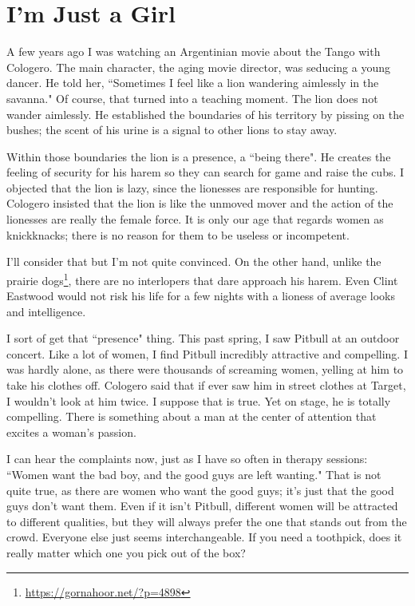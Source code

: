 \section{I'm Just a Girl}

A few years ago I was watching an Argentinian movie about the Tango with Cologero. The main character, the aging movie director, was seducing a young dancer. He told her, ``Sometimes I feel like a lion wandering aimlessly in the savanna." Of course, that turned into a teaching moment. The lion does not wander aimlessly. He established the boundaries of his territory by pissing on the bushes; the scent of his urine is a signal to other lions to stay away.

Within those boundaries the lion is a presence, a ``being there". He creates the feeling of security for his harem so they can search for game and raise the cubs. I objected that the lion is lazy, since the lionesses are responsible for hunting. Cologero insisted that the lion is like the unmoved mover and the action of the lionesses are really the female force. It is only our age that regards women as knickknacks; there is no reason for them to be useless or incompetent.

I'll consider that but I'm not quite convinced. On the other hand, unlike the prairie dogs\footnote{\url{https://gornahoor.net/?p=4898}}, there are no interlopers that dare approach his harem. Even Clint Eastwood would not risk his life for a few nights with a lioness of average looks and intelligence.

I sort of get that ``presence" thing. This past spring, I saw Pitbull at an outdoor concert. Like a lot of women, I find Pitbull incredibly attractive and compelling. I was hardly alone, as there were thousands of screaming women, yelling at him to take his clothes off. Cologero said that if ever saw him in street clothes at Target, I wouldn't look at him twice. I suppose that is true. Yet on stage, he is totally compelling. There is something about a man at the center of attention that excites a woman's passion.

I can hear the complaints now, just as I have so often in therapy sessions: ``Women want the bad boy, and the good guys are left wanting." That is not quite true, as there are women who want the good guys; it's just that the good guys don't want them. Even if it isn't Pitbull, different women will be attracted to different qualities, but they will always prefer the one that stands out from the crowd. Everyone else just seems interchangeable. If you need a toothpick, does it really matter which one you pick out of the box?

